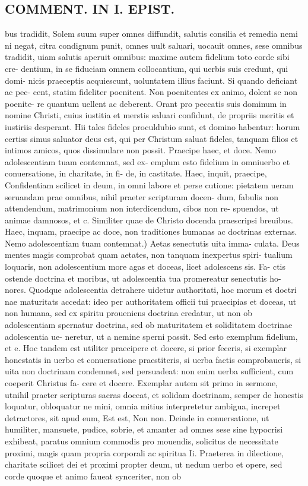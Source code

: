 \documentclass{article}
\begin{document}
\begin{pages}
\section*{COMMENT. IN I. EPIST. }
\marginpar{[ p.510 ]}\pstart bus tradidit, Solem suum super omnes diffundit, salutis consilia et remedia nemi ni negat, citra condignum punit, omnes uult saluari, uocauit omnes, sese omnibus tradidit, uiam salutis aperuit omnibus: maxime autem fidelium toto corde sibi cre- dentium, in se fiduciam omnem collocantium, qui uerbis suis credunt, qui domi- nicis praeceptis acquiescunt, uoluntatem illius faciunt. Si quando deficiant ac pec- cent, statim fideliter poenitent. Non poenitentes ex animo, dolent se non poenite- re quantum uellent ac deberent. Orant pro peccatis suis dominum in nomine Christi, cuius iustitia et merstis saluari confidunt, de propriis meritis et iustiriis desperant. Hii tales fideles proculdubio sunt, et domino habentur: horum certiss simus saluator deus est, qui per Christum saluat fideles, tanquam filios et intimos amicos, quos dissimulare non possit.  \pend\pstart Praecipe haec, et doce. Nemo adolescentiam tuam contemnat, sed ex- emplum esto fidelium in omniuerbo et conuersatione, in charitate, in fi- de, in castitate.  \pend\pstart Haec, inquit, praecipe, Confidentiam scilicet in deum, in omni labore et perse cutione: pietatem ueram seruandam prae omnibus, nihil praeter scripturam docen- dum, fabulis non attendendum, matrimonium non interdicendum, cibos non re- spuendos, ut animae damnosos, et c. Similiter quae de Christo docenda praescripsi breuibus. Haec, inquam, praecipe ac doce, non traditiones humanas ac doctrinas externas. Nemo adolescentiam tuam contemnat.) Aetas senectutis uita imma- culata. Deus mentes magis comprobat quam aetates, non tanquam inexpertus spiri- tualium loquaris, non adolescentium more agas et doceas, licet adolescens sis. Fa- ctis ostende doctrina et moribus, ut adolescentia tua promereatur senectutis ho- nores. Quodque adolescentia detrahere uidetur authoritati, hoc morum et doctri nae maturitats accedat: ideo per authoritatem officii tui praecipias et doceas, ut non humana, sed ex spiritu proueniens doctrina credatur, ut non ob adolescentiam spernatur doctrina, sed ob maturitatem et soliditatem doctrinae adolescentia ue- neretur, ut a nemine sperni possit. Sed esto exemplum fidelium, et e. Hoc tandem est utiliter praecipere et docere, si prior feceris, si exemplar honestatis in uerbo et conuersatione praestiteris, si uerba factis comprobaueris, si uita non doctrinam condemnet, sed persuadeat: non enim uerba sufficient, cum coeperit Christus fa- cere et docere. Exemplar autem sit primo in sermone, utnihil praeter scripturas sacras doceat, et solidam doctrinam, semper de honestis loquatur, obloquatur ne mini, omnia mitius interpretetur ambigua, increpet detractores, sit apud eum, Est est, Non non. Deinde in conuersatione, ut humiliter, mansuete, pudice, sobrie, et amanter ad omnes sese sine hypocrisi exhibeat, paratus omnium commodis pro mouendis, solicitus de necessitate proximi, magis quam propria corporali ac spiritua Ii. Praeterea in dilectione, charitate scilicet dei et proximi propter deum, ut nedum uerbo et opere, sed corde quoque et animo faueat synceriter, non ob 
\end{pages}
\end{document}
